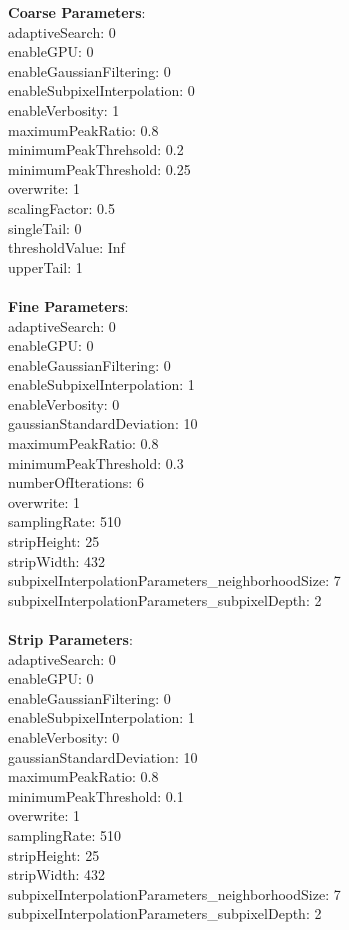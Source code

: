 \documentclass[11pt]{article}
\begin{document}
\textbf{Coarse Parameters}: \\
adaptiveSearch: 0\\
enableGPU: 0\\
enableGaussianFiltering: 0\\
enableSubpixelInterpolation: 0\\
enableVerbosity: 1\\
maximumPeakRatio: 0.8\\
minimumPeakThrehsold: 0.2\\
minimumPeakThreshold: 0.25\\
overwrite: 1\\
scalingFactor: 0.5\\
singleTail: 0\\
thresholdValue: Inf\\
upperTail: 1\\
\\
\textbf{Fine Parameters}: \\
adaptiveSearch: 0\\
enableGPU: 0\\
enableGaussianFiltering: 0\\
enableSubpixelInterpolation: 1\\
enableVerbosity: 0\\
gaussianStandardDeviation: 10\\
maximumPeakRatio: 0.8\\
minimumPeakThreshold: 0.3\\
numberOfIterations: 6\\
overwrite: 1\\
samplingRate: 510\\
stripHeight: 25\\
stripWidth: 432\\
subpixelInterpolationParameters\_neighborhoodSize: 7\\
subpixelInterpolationParameters\_subpixelDepth: 2\\
\\
\textbf{Strip Parameters}: \\
adaptiveSearch: 0\\
enableGPU: 0\\
enableGaussianFiltering: 0\\
enableSubpixelInterpolation: 1\\
enableVerbosity: 0\\
gaussianStandardDeviation: 10\\
maximumPeakRatio: 0.8\\
minimumPeakThreshold: 0.1\\
overwrite: 1\\
samplingRate: 510\\
stripHeight: 25\\
stripWidth: 432\\
subpixelInterpolationParameters\_neighborhoodSize: 7\\
subpixelInterpolationParameters\_subpixelDepth: 2\\
\\
\newpage
\end{document}
